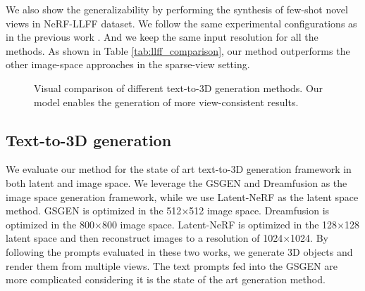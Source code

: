 We also show the generalizability by performing the synthesis of few-shot novel views in NeRF-LLFF dataset.  We follow the same experimental configurations as in the previous work \citep{li2024dngaussian,liu20243dgs}. And we keep the same input resolution for all the methods. As shown in Table \ref{tab:llff_comparison}, our method  outperforms the other image-space approaches in the sparse-view setting.
\vspace{-1em}
\begin{figure}[!t]
    \centering
    \label{fig:3D-generation}
    \vspace{-.5em}
    \caption{Visual comparison of different text-to-3D generation methods. Our model enables the generation of more view-consistent results.}
       
\label{fig: generation}
\end{figure}
\vspace{.1em}

\subsection{Text-to-3D generation}
We evaluate our method for the state of art text-to-3D generation framework in both latent and image space. We leverage the GSGEN \citep{chen2024textto3dusinggaussiansplatting} and Dreamfusion \citep{poole2022dreamfusion} as the image space generation framework, while we use Latent-NeRF \citep{metzer2022latent} as the latent space method. GSGEN is optimized in the 512\(\times\)512 image space. Dreamfusion is optimized in the 800\(\times\)800 image space. Latent-NeRF is optimized in the 128\(\times\)128 latent space and then reconstruct images to a resolution of 1024\(\times\)1024.  By following the prompts evaluated in these two works, we generate 3D objects and render them from multiple views. The text prompts fed into the GSGEN are more complicated considering it is the state of the art generation method. 

